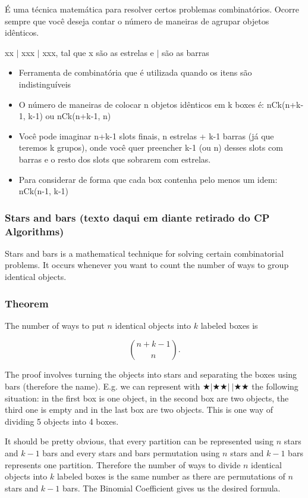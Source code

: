 É uma técnica matemática para resolver certos problemas combinatórios. Ocorre sempre que você deseja contar o número de maneiras de agrupar objetos idênticos.
 
xx $\vert$ xxx $\vert$ xxx, tal que x são as estrelas e $\vert$ são as barras

\begin{itemize}
  \item Ferramenta de combinatória que é utilizada quando os itens são indistinguíveis
  \item O número de maneiras de colocar n objetos idênticos em k boxes é: nCk(n+k-1, k-1) ou nCk(n+k-1, n)
  \item Você pode imaginar n+k-1 slots finais, n estrelas + k-1 barras (já que teremos k grupos), onde você quer preencher k-1 (ou n) desses slots com barras e o resto dos slots que sobrarem com estrelas.
  \item Para considerar de forma que cada box contenha pelo menos um idem: nCk(n-1, k-1)
\end{itemize}

\subsubsection*{Stars and bars (texto daqui em diante retirado do CP Algorithms)}

Stars and bars is a mathematical technique for solving certain combinatorial problems.
It occurs whenever you want to count the number of ways to group identical objects.

\subsubsection*{Theorem}

The number of ways to put $n$ identical objects into $k$ labeled boxes is

$$\binom{n + k - 1}{n}.$$

The proof involves turning the objects into stars and separating the boxes using bars (therefore the name).
E.g. we can represent with $\bigstar | \bigstar \bigstar |~| \bigstar \bigstar$ the following situation:
in the first box is one object, in the second box are two objects, the third one is empty and in the last box are two objects.
This is one way of dividing 5 objects into 4 boxes.

It should be pretty obvious, that every partition can be represented using $n$ stars and $k - 1$ bars and every stars and bars permutation using $n$ stars and $k - 1$ bars represents one partition.
Therefore the number of ways to divide $n$ identical objects into $k$ labeled boxes is the same number as there are permutations of $n$ stars and $k - 1$ bars.
The Binomial Coefficient gives us the desired formula.


